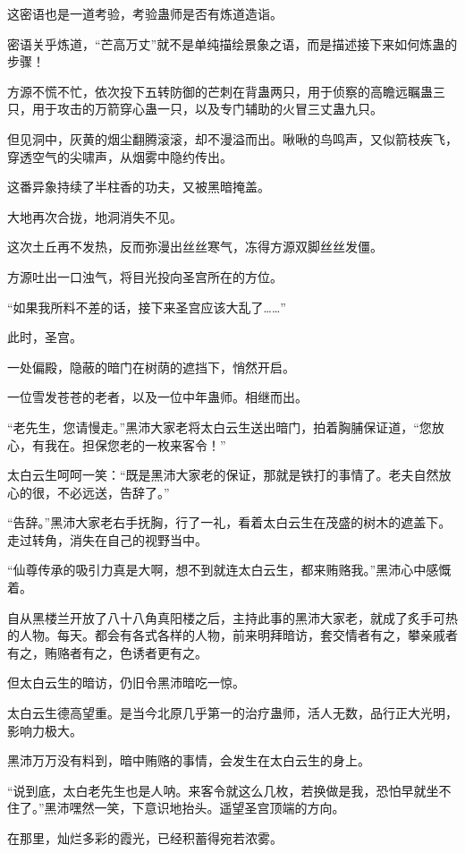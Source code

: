 \begin{this_body}
这密语也是一道考验，考验蛊师是否有炼道造诣。

密语关乎炼道，“芒高万丈”就不是单纯描绘景象之语，而是描述接下来如何炼蛊的步骤！

方源不慌不忙，依次投下五转防御的芒刺在背蛊两只，用于侦察的高瞻远瞩蛊三只，用于攻击的万箭穿心蛊一只，以及专门辅助的火冒三丈蛊九只。

但见洞中，灰黄的烟尘翻腾滚滚，却不漫溢而出。啾啾的鸟鸣声，又似箭枝疾飞，穿透空气的尖啸声，从烟雾中隐约传出。

这番异象持续了半柱香的功夫，又被黑暗掩盖。

大地再次合拢，地洞消失不见。

这次土丘再不发热，反而弥漫出丝丝寒气，冻得方源双脚丝丝发僵。

方源吐出一口浊气，将目光投向圣宫所在的方位。

“如果我所料不差的话，接下来圣宫应该大乱了……”

此时，圣宫。

一处偏殿，隐蔽的暗门在树荫的遮挡下，悄然开启。

一位雪发苍苍的老者，以及一位中年蛊师。相继而出。

“老先生，您请慢走。”黑沛大家老将太白云生送出暗门，拍着胸脯保证道，“您放心，有我在。担保您老的一枚来客令！”

太白云生呵呵一笑：“既是黑沛大家老的保证，那就是铁打的事情了。老夫自然放心的很，不必远送，告辞了。”

“告辞。”黑沛大家老右手抚胸，行了一礼，看着太白云生在茂盛的树木的遮盖下。走过转角，消失在自己的视野当中。

“仙尊传承的吸引力真是大啊，想不到就连太白云生，都来贿赂我。”黑沛心中感慨着。

自从黑楼兰开放了八十八角真阳楼之后，主持此事的黑沛大家老，就成了炙手可热的人物。每天。都会有各式各样的人物，前来明拜暗访，套交情者有之，攀亲戚者有之，贿赂者有之，色诱者更有之。

但太白云生的暗访，仍旧令黑沛暗吃一惊。

太白云生德高望重。是当今北原几乎第一的治疗蛊师，活人无数，品行正大光明，影响力极大。

黑沛万万没有料到，暗中贿赂的事情，会发生在太白云生的身上。

“说到底，太白老先生也是人呐。来客令就这么几枚，若换做是我，恐怕早就坐不住了。”黑沛嘿然一笑，下意识地抬头。遥望圣宫顶端的方向。

在那里，灿烂多彩的霞光，已经积蓄得宛若浓雾。


\end{this_body}
